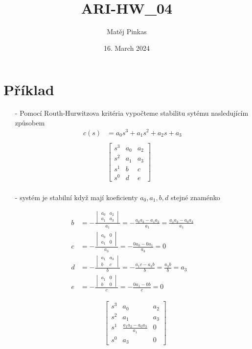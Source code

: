 \documentclass{article}
\title{ARI-HW\_04}
\author{Matěj Pinkas}
\date{16. March 2024}
\newcommand\mat[1]{\begin{bmatrix}#1\end{bmatrix}}
\newcommand\vmat[1]{\begin{vmatrix}#1\end{vmatrix}}
\begin{document}
\maketitle

\section{Příklad}

\begin{itemize}
    \item[-] Pomocí Routh-Hurwitzova kritéria vypočteme stabilitu sytému nasledujícím způsobem
    \begin{align*}
        c(s) &= a_0s^3+a_1s^2+a_2s+a_3\\
        \\
        &\mat{s^3 & a_0 & a_2\\
             s^2 & a_1 & a_3\\
             s^1 & b & c\\
             s^0 & d & e}\\
    \end{align*}
    
    \item[-] systém je stabilní když mají koeficienty $a_0, a_1, b, d$ stejné znaménko
    
    \begin{align*}
        b &= -\frac{\vmat{a_0 & a_2\\ a_1 & a_3}}{a_1} = -\frac{a_0a_3-a_1a_2}{a_1} = \frac{a_1a_2-a_0a_3}{a_1}\\
        c &= -\frac{\vmat{a_0 & 0\\ a_1 & 0}}{a_3} = -\frac{0a_0-0a_1}{a_3}=0\\
        d &= -\frac{\vmat{a_1 & a_3\\ b & c}}{b} = -\frac{a_1c-a_3b}{b} = \frac{a_3b}{b} = a_3\\
        e &= -\frac{\vmat{a_1 & 0\\ b & 0}}{c} = -\frac{0a_1-0b}{c}=0
    \end{align*}
    
    \begin{align*}
        &\mat{s^3 & a_0 & a_2\\
             s^2 & a_1 & a_3\\
             s^1 & \frac{a_1a_2-a_0a_3}{a_1} & 0\\
             s^0 & a_3 & 0}\\
    \end{align*}


\end{itemize}
\end{document}
